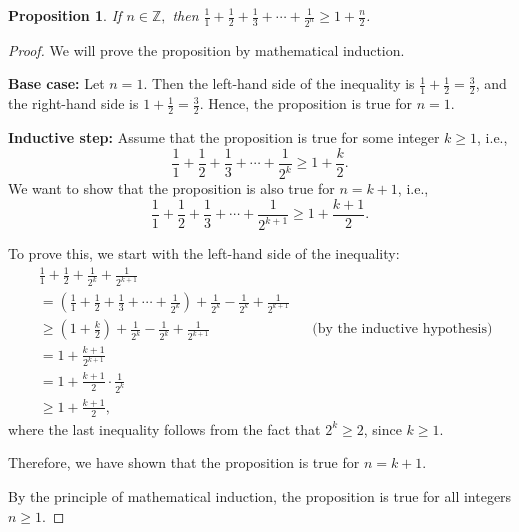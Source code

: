 \documentclass{article}
\newtheorem*{theorem}{Proposition}
\begin{document}
\begin{theorem}
    If $n \in \mathbb{Z}, $ then $\frac{1}{1} + \frac{1}{2} + \frac{1}{3} + \cdots + \frac{1}{2^n} \geq 1 + \frac{n}{2}$.
\end{theorem}
\begin{proof}
We will prove the proposition by mathematical induction.

\textbf{Base case:} Let $n=1$. Then the left-hand side of the inequality is $\frac{1}{1} + \frac{1}{2} = \frac{3}{2}$, and the right-hand side is $1 + \frac{1}{2} = \frac{3}{2}$. Hence, the proposition is true for $n=1$. 

\textbf{Inductive step:} Assume that the proposition is true for some integer $k\geq1$, i.e., 
\[\frac{1}{1} + \frac{1}{2} + \frac{1}{3} + \cdots + \frac{1}{2^k} \geq 1 + \frac{k}{2}.\]
We want to show that the proposition is also true for $n=k+1$, i.e., 
\[\frac{1}{1} + \frac{1}{2} + \frac{1}{3} + \cdots + \frac{1}{2^{k+1}} \geq 1 + \frac{k+1}{2}.\]

To prove this, we start with the left-hand side of the inequality:
\begin{align*}
    &\frac{1}{1} + \frac{1}{2} + \frac{1}{2^k} + \frac{1}{2^{k+1}} \\
    &= \left(\frac{1}{1} + \frac{1}{2} + \frac{1}{3} + \cdots + \frac{1}{2^k}\right) + \frac{1}{2^{k}} - \frac{1}{2^{k}} + \frac{1}{2^{k+1}} \\
    &\geq \left(1 + \frac{k}{2}\right) + \frac{1}{2^{k}} - \frac{1}{2^{k}} + \frac{1}{2^{k+1}} && \text{(by the inductive hypothesis)} \\
    &= 1 + \frac{k+1}{2^{k+1}} \\
    &= 1 + \frac{k+1}{2}\cdot\frac{1}{2^k} \\
    &\geq 1 + \frac{k+1}{2},
\end{align*}
where the last inequality follows from the fact that $2^k \geq 2$, since $k\geq 1$. 

Therefore, we have shown that the proposition is true for $n=k+1$. 

By the principle of mathematical induction, the proposition is true for all integers $n\geq1$. 
\end{proof}
\end{document}
